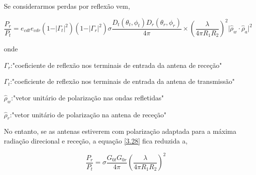 Se considerarmos perdas por reflexão vem,  

\begin{equation} \label{3.28}
\dfrac{P_{r}}{P_{t}}=e_{cdt}e_{cdr}\left( 1-\vert\Gamma_{t}\vert^{2}\right)\left( 1-\vert\Gamma_{r}\vert^{2}\right)\sigma \dfrac{D_{t}\left( \theta_{t},\phi_{t}\right)D_{r}\left( \theta_{r},\phi_{r}\right) }{4\pi}\times\left( \dfrac{\lambda}{4\pi R_{1}R_{2}}\right)^{2}\vert\hat{\rho}_{w}\cdot \hat{\rho}_{a}\vert^{2}
\end{equation}

onde \par 
$\Gamma_{r}$:"coeficiente de reflexão nos terminais de entrada da antena de receção" \par
$\Gamma_{t}$:"coeficiente de reflexão nos terminais de entrada da antena de transmissão" \par
$\hat{\rho}_{w}$:"vetor unitário de polarização nas ondas refletidas"\par
$\hat{\rho}_{r}$:"vetor unitário de polarização na antena de receção"\par

No entanto, se as antenas estiverem com polarização adaptada para a máxima radiação direcional e receção, a equação \ref{3.28} fica reduzida a,

\begin{equation} \label{3.29}
\dfrac{P_{r}}{P_{t}}=\sigma \dfrac{G_{0t}G_{0r}}{4\pi}\left( \dfrac{\lambda}{4\pi R_{1}R_{2}}\right)^{2} 
\end{equation}








